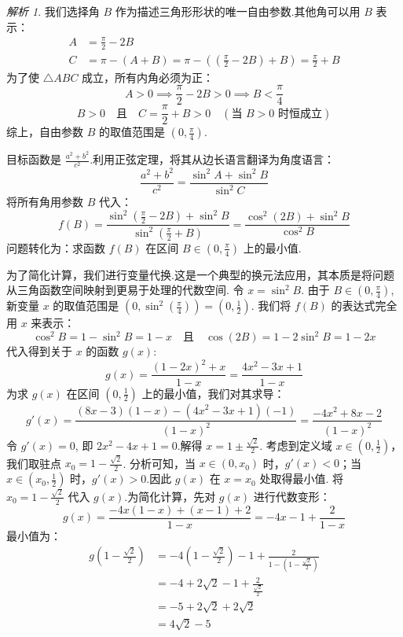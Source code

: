 \documentclass[12pt,a4paper]{ctexbook}
\theoremstyle{definition}
\theoremstyle{remark}
\newtheorem*{solution}{解析}
\begin{document}
\begin{solution}
		我们选择角 $B$ 作为描述三角形形状的唯一自由参数.其他角可以用 $B$ 表示：
		\begin{align*}
			A &= \frac{\pi}{2}-2B \\
			C &= \pi - (A+B) = \pi - \left(\left(\frac{\pi}{2}-2B\right)+B\right) = \frac{\pi}{2}+B
		\end{align*}
		为了使 $\triangle ABC$ 成立，所有内角必须为正：
		\[
		A > 0 \implies \frac{\pi}{2}-2B > 0 \implies B < \frac{\pi}{4}
		\]
		\[
		B > 0 \quad \text{且} \quad C = \frac{\pi}{2}+B > 0 \quad (\text{当 } B>0 \text{ 时恒成立})
		\]
		综上，自由参数 $B$ 的取值范围是 $(0, \frac{\pi}{4})$.
		
		目标函数是 $\frac{a^2+b^2}{c^2}$.利用正弦定理，将其从边长语言翻译为角度语言：
		\[
		\frac{a^2+b^2}{c^2} = \frac{\sin^2 A + \sin^2 B}{\sin^2 C}
		\]
		将所有角用参数 $B$ 代入：
		\[
		f(B) = \frac{\sin^2(\frac{\pi}{2}-2B) + \sin^2 B}{\sin^2(\frac{\pi}{2}+B)} = \frac{\cos^2(2B) + \sin^2 B}{\cos^2 B}
		\]
		问题转化为：求函数 $f(B)$ 在区间 $B \in (0, \frac{\pi}{4})$ 上的最小值.
		
		为了简化计算，我们进行变量代换.这是一个典型的换元法应用，其本质是将问题从三角函数空间映射到更易于处理的代数空间.
		令 $x = \sin^2 B$.
		由于 $B \in (0, \frac{\pi}{4})$, 新变量 $x$ 的取值范围是 $(0, \sin^2(\frac{\pi}{4})) = (0, \frac{1}{2})$.
		我们将 $f(B)$ 的表达式完全用 $x$ 来表示：
		\[
		\cos^2 B = 1-\sin^2 B = 1-x \quad \text{且} \quad \cos(2B) = 1-2\sin^2 B = 1-2x
		\]
		代入得到关于 $x$ 的函数 $g(x)$:
		\[
		g(x) = \frac{(1-2x)^2+x}{1-x} = \frac{4x^2-3x+1}{1-x}
		\]
		为求 $g(x)$ 在区间 $(0, \frac{1}{2})$ 上的最小值，我们对其求导：
		\[
		g'(x) = \frac{(8x-3)(1-x) - (4x^2-3x+1)(-1)}{(1-x)^2} = \frac{-4x^2+8x-2}{(1-x)^2}
		\]
		令 $g'(x)=0$, 即 $2x^2-4x+1 = 0$.解得 $x = 1 \pm \frac{\sqrt{2}}{2}$.
		考虑到定义域 $x \in (0, \frac{1}{2})$，我们取驻点 $x_0 = 1 - \frac{\sqrt{2}}{2}$.
		分析可知，当 $x \in (0, x_0)$ 时，$g'(x)<0$；当 $x \in (x_0, \frac{1}{2})$ 时，$g'(x)>0$.因此 $g(x)$ 在 $x=x_0$ 处取得最小值.
		将 $x_0 = 1 - \frac{\sqrt{2}}{2}$ 代入 $g(x)$.为简化计算，先对 $g(x)$ 进行代数变形：
		\[
		g(x) = \frac{-4x(1-x)+(x-1)+2}{1-x} = -4x-1+\frac{2}{1-x}
		\]
		最小值为：
		\begin{align*}
			g\left(1 - \frac{\sqrt{2}}{2}\right) &= -4\left(1-\frac{\sqrt{2}}{2}\right) - 1 + \frac{2}{1-\left(1-\frac{\sqrt{2}}{2}\right)} \\
			&= -4 + 2\sqrt{2} - 1 + \frac{2}{\frac{\sqrt{2}}{2}} \\
			&= -5 + 2\sqrt{2} + 2\sqrt{2} \\
			&= 4\sqrt{2}-5
		\end{align*}\hfill\qedsymbol
	\end{solution}
	
\end{document}
